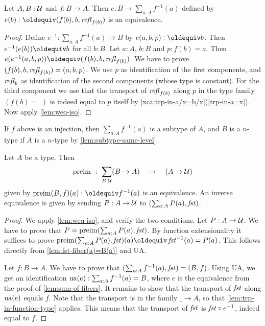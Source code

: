 \begin{definition}
\begin{lemma}\label{lem:sum-of-fibers}
Let $A,B:\mathcal{U}$ and $f:B\to A$. 
Then $e: B \to \sum_{a:A} f^{-1}(a)$ defined by
$e(b)\defeq (f(b),b,\refl{f(b)})$ is an equivalence.
\end{lemma}
\begin{proof}
Define $e^{-1}: \sum_{a:A} f^{-1}(a) \to B$ by $e(a,b,p)\defeq b$.
Then $e^{-1}(e(b))\jdeq b$ for all $b:B$.
Let $a:A$, $b:B$ and $p: f(b)=a$.
Then $e(e^{-1}(a,b,p))\jdeq (f(b),b,\refl{f(b)})$.
We have to prove $(f(b),b,\mathop{{\it refl}_{f(b)}})=(a,b,p)$.
We use $p$ as identification of the first components,
and $\mathop{{\it refl}_{b}}$ as identification of the second components
(whose type is constant). For the third component
we use that the transport of $\mathop{{\it refl}_{f(b)}}$ along $p$
in the type family $(f(b)=\_)$ is indeed equal to $p$
itself by \cref{xca:trp-in-a/x=b/x}(\ref{trp-in-a=x}).
Now apply \cref{lem:weq-iso}.
\end{proof}

If $f$ above is an injection, then $\sum_{a:A} f^{-1}(a)$ is a subtype of $A$,
and $B$ is a $n$-type if $A$ is a $n$-type by \cref{lem:subtype-same-level}.

\begin{lemma}\label{lem:typefamiliesandfibrations}
Let $A$ be a type. Then
\[
\mathop{\mathrm{preim}} ~:~ \sum_{B:\mathcal{U}}(B\to A) \quad\to\quad (A\to\mathcal{U}) 
\] 
given by $\preim(B,f)(a)\defeq f^{-1}(a)$ is an equivalence.
An inverse equivalence is given by sending $P:A\to\mathcal{U}$ to 
$(\sum_{a:A}P(a), \mathop{\mathit{fst}})$.
\end{lemma}

\begin{proof}
We apply \cref{lem:weq-iso}, and verify the two conditions.
Let $P:A\to\mathcal{U}$. We have to prove that $P = \mathop{\mathrm{preim}}(\sum_{a:A}P(a), \mathop{\mathit{fst}})$.
By function extensionality it suffices to prove
$\preim(\sum_{a:A}P(a), \fst)(a)\jdeq \fst^{-1}(a) = P(a)$.
This follows directly from \cref{lem:fst-fiber(a)=B(a)} and UA.

Let $f: B\to A$. We have to prove that $(\sum_{a:A} f^{-1}(a), \mathop{\mathit{fst}})=(B,f)$.
Using UA, we get an identification
$\mathrm{ua}(e) : \sum_{a:A} f^{-1}(a) = B$, where $e$ is the equivalence
from the proof of \cref{lem:sum-of-fibers}. It remains
to show that the transport of $\mathop{\mathit{fst}}$ along $\mathrm{ua}(e)$ equals $f$.
Note that the transport is in the family $\_\to A$, so that
\cref{lem:trp-in-function-type} applies. This means that
the transport of $\mathop{\mathit{fst}}$ is ${\mathop{\mathit{fst}}} \circ {e^{-1}}$, indeed equal to $f$.
\end{proof}


\end{definition}
